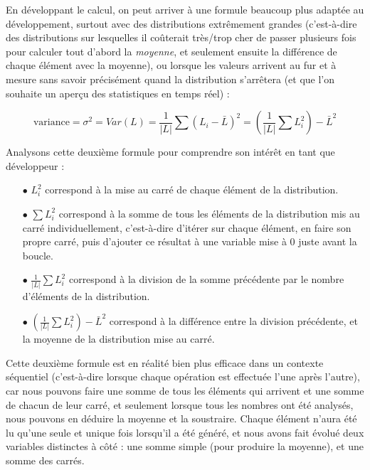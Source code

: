 \documentclass[11pt,a4paper]{article}
\begin{document}
\bigskip

En développant le calcul, on peut arriver à une formule beaucoup plus adaptée au développement, surtout avec des distributions extrêmement grandes (c'est-à-dire des distributions sur lesquelles il coûterait très/trop cher de passer plusieurs fois pour calculer tout d'abord la \textit{moyenne}, et seulement ensuite la différence de chaque élément avec la moyenne), ou lorsque les valeurs arrivent au fur et à mesure sans savoir précisément quand la distribution s'arrêtera (et que l'on souhaite un aperçu des statistiques en temps réel) :

\begin{center}
\begin{equation*}
\text{variance} = \sigma^{2} = Var(L) = \frac{1}{|L|} \sum (L_{i} - \bar{L})^{2} = \left( \frac{1}{|L|} \sum L_{i}^{2} \right) - \bar{L}^{2}
\end{equation*}
\end{center}

\bigskip

Analysons cette deuxième formule pour comprendre son intérêt en tant que développeur :

\medskip

\begin{itemize}
\item[$\bullet$] $ L_{i}^{2} $ correspond à la mise au carré de chaque élément de la distribution.

\item[$\bullet$] $ \sum L_{i}^{2} $ correspond à la somme de tous les éléments de la distribution mis au carré individuellement, c'est-à-dire d'itérer sur chaque élément, en faire son propre carré, puis d'ajouter ce résultat à une variable mise à $ 0 $ juste avant la boucle.

\item[$\bullet$] $ \frac{1}{|L|} \sum L_{i}^{2} $ correspond à la division de la somme précédente par le nombre d'éléments de la distribution.

\item[$\bullet$] $ ( \frac{1}{|L|} \sum L_{i}^{2} ) - \bar{L}^{2} $ correspond à la différence entre la division précédente, et la moyenne de la distribution mise au carré.
\end{itemize}

Cette deuxième formule est en réalité bien plus efficace dans un contexte séquentiel (c'est-à-dire lorsque chaque opération est effectuée l'une après l'autre), car nous pouvons faire une somme de tous les éléments qui arrivent et une somme de chacun de leur carré, et seulement lorsque tous les nombres ont été analysés, nous pouvons en déduire la moyenne et la soustraire.
Chaque élément n'aura été lu qu'une seule et unique fois lorsqu'il a été généré, et nous avons fait évolué deux variables distinctes à côté : une somme simple (pour produire la moyenne), et une somme des carrés.
\end{document}
